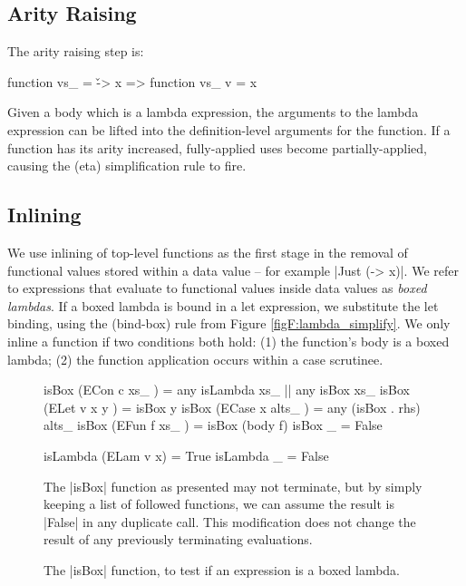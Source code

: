 \subsection{Arity Raising}

The arity raising step is:

\ignore\begin{code}
function vs_ = \v -> x
    => function vs_ v = x
\end{code}

Given a body which is a lambda expression, the arguments to the lambda expression can be lifted into the definition-level arguments for the function. If a function has its arity increased, fully-applied uses become partially-applied, causing the (eta) simplification rule to fire.


\subsection{Inlining}
\label{secF:inlining}

We use inlining of top-level functions as the first stage in the removal of functional values stored within a data value -- for example |Just (\x -> x)|. We refer to expressions that evaluate to functional values inside data values as \textit{boxed lambdas}. If a boxed lambda is bound in a let expression, we substitute the let binding, using the (bind-box) rule from Figure \ref{figF:lambda_simplify}. We only inline a function if two conditions both hold: (1) the function's body is a boxed lambda; (2) the function application occurs within a case scrutinee.

\begin{figure}
\begin{code}
isBox (ECon c xs_     )  =  any isLambda xs_ ||  any isBox xs_
isBox (ELet v x y     )  =  isBox y
isBox (ECase x alts_  )  =  any (isBox . rhs) alts_
isBox (EFun f xs_     )  =  isBox (body f)
isBox _                  =  False

isLambda (ELam v x)  = True
isLambda _           = False
\end{code}

The |isBox| function as presented may not terminate, but by simply keeping a list of followed functions, we can assume the result is |False| in any duplicate call. This modification does not change the result of any previously terminating evaluations.
\caption{The |isBox| function, to test if an expression is a boxed lambda.}
\label{figF:boxed_lambda}
\end{figure}

